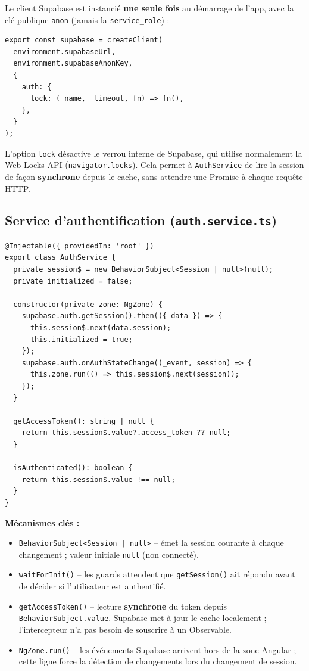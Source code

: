 \documentclass[12pt,a4paper]{article}
\begin{document}
Le client Supabase est instancié \textbf{une seule fois} au démarrage de l'app,
avec la clé publique \texttt{anon} (jamais la \texttt{service\_role}) :

\begin{lstlisting}
export const supabase = createClient(
  environment.supabaseUrl,
  environment.supabaseAnonKey,
  {
    auth: {
      lock: (_name, _timeout, fn) => fn(),
    },
  }
);
\end{lstlisting}

L'option \texttt{lock} désactive le verrou interne de Supabase, qui utilise
normalement la Web Locks API (\texttt{navigator.locks}). Cela permet à
\texttt{AuthService} de lire la session de façon \textbf{synchrone} depuis
le cache, sans attendre une Promise à chaque requête HTTP.

\subsection{Service d'authentification (\texttt{auth.service.ts})}

\begin{lstlisting}
@Injectable({ providedIn: 'root' })
export class AuthService {
  private session$ = new BehaviorSubject<Session | null>(null);
  private initialized = false;

  constructor(private zone: NgZone) {
    supabase.auth.getSession().then(({ data }) => {
      this.session$.next(data.session);
      this.initialized = true;
    });
    supabase.auth.onAuthStateChange((_event, session) => {
      this.zone.run(() => this.session$.next(session));
    });
  }

  getAccessToken(): string | null {
    return this.session$.value?.access_token ?? null;
  }

  isAuthenticated(): boolean {
    return this.session$.value !== null;
  }
}
\end{lstlisting}

\textbf{Mécanismes clés :}
\begin{itemize}
  \item \texttt{BehaviorSubject<Session | null>} -- émet la session courante à chaque
        changement ; valeur initiale \texttt{null} (non connecté).
  \item \texttt{waitForInit()} -- les guards attendent que \texttt{getSession()} ait
        répondu avant de décider si l'utilisateur est authentifié.
  \item \texttt{getAccessToken()} -- lecture \textbf{synchrone} du token depuis
        \texttt{BehaviorSubject.value}. Supabase met à jour le cache localement ;
        l'intercepteur n'a pas besoin de souscrire à un Observable.
  \item \texttt{NgZone.run()} -- les événements Supabase arrivent hors de la zone
        Angular ; cette ligne force la détection de changements lors du changement
        de session.
\end{itemize}
\end{document}
